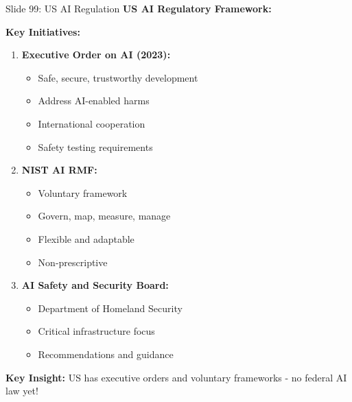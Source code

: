 \documentclass[8pt]{beamer}
\begin{document}
	\begin{frame}{Slide 99: US AI Regulation}
		\fontsize{6.5}{7.5}\selectfont
		\textbf{US AI Regulatory Framework:}
		
		\vspace{0.1cm}
		\textbf{Key Initiatives:}
		\begin{enumerate}
			\item \textbf{Executive Order on AI (2023):}
			\begin{itemize}
				\item Safe, secure, trustworthy development
				\item Address AI-enabled harms
				\item International cooperation
				\item Safety testing requirements
			\end{itemize}
			\item \textbf{NIST AI RMF:}
			\begin{itemize}
				\item Voluntary framework
				\item Govern, map, measure, manage
				\item Flexible and adaptable
				\item Non-prescriptive
			\end{itemize}
			\item \textbf{AI Safety and Security Board:}
			\begin{itemize}
				\item Department of Homeland Security
				\item Critical infrastructure focus
				\item Recommendations and guidance
			\end{itemize}
		\end{enumerate}
		
		\textcolor{myblue}{\textbf{Key Insight:}} US has \textcolor{myblue}{executive orders and voluntary frameworks} - no federal AI law yet!
	\end{frame}
	
\end{document}
